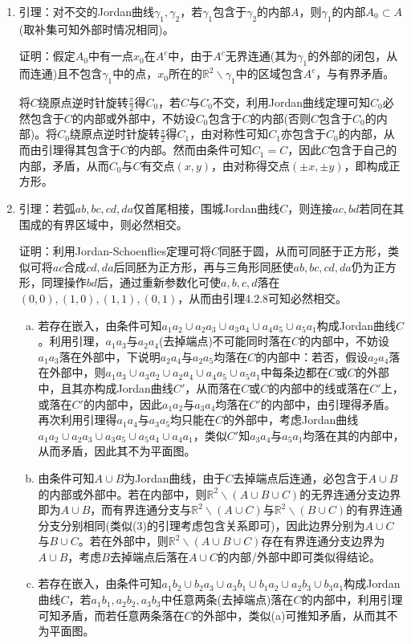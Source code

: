 \documentclass[a4paper,UTF8,fontset=windows]{ctexart}
\begin{document}
\begin{enumerate}[(1)]
    \item
    引理：对不交的Jordan曲线$\gamma_1,\gamma_2$，若$\gamma_1$包含于$\gamma_2$的内部$A$，则$\gamma_1$的内部$A_0\subset A$(取补集可知外部时情况相同)。

    证明：假定$A_0$中有一点$x_0$在$A^c$中，由于$A^c$无界连通(其为$\gamma_1$的外部的闭包，从而连通)且不包含$\gamma_1$中的点，$x_0$所在的$\mathbb{R}^2\backslash\gamma_1$中的区域包含$A^c$，与有界矛盾。

    将$C$绕原点逆时针旋转$\frac{\pi}{2}$得$C_0$，若$C$与$C_0$不交，利用Jordan曲线定理可知$C_0$必然包含于$C$的内部或外部中，不妨设$C_0$包含于$C$的内部(否则$C$包含于$C_0$的内部)。将$C_0$绕原点逆时针旋转$\frac{\pi}{2}$得$C_1$，由对称性可知$C_1$亦包含于$C_0$的内部，从而由引理得其包含于$C$的内部。然而由条件可知$C_1=C$，因此$C$包含于自己的内部，矛盾，从而$C_0$与$C$有交点$(x,y)$，由对称得交点$(\pm x,\pm y)$，即构成正方形。

    \item
    引理：若弧$ab,bc,cd,da$仅首尾相接，围城Jordan曲线$C$，则连接$ac,bd$若同在其围成的有界区域中，则必然相交。

    证明：利用Jordan-Schoenflies定理可将$C$同胚于圆，从而可同胚于正方形，类似可将$ac$合成$cd,da$后同胚为正方形，再与三角形同胚使$ab,bc,cd,da$仍为正方形，同理操作$bd$后，通过重新参数化可使$a,b,c,d$落在$(0,0),(1,0),(1,1),(0,1)$，从而由引理4.2.8可知必然相交。

    \begin{enumerate}[(a)]
    \item
    若存在嵌入，由条件可知$a_1a_2\cup a_2a_3\cup a_3a_4\cup a_4a_5\cup a_5a_1$构成Jordan曲线$C$。利用引理，$a_1a_3$与$a_2a_4$(去掉端点)不可能同时落在$C$的内部中，不妨设$a_1a_3$落在外部中，下说明$a_2a_4$与$a_2a_5$均落在$C$的内部中：若否，假设$a_2a_4$落在外部中，则$a_1a_3\cup a_3a_2\cup a_2a_4\cup a_4a_5\cup a_5a_1$中每条边都在$C$或$C$的外部中，且其亦构成Jordan曲线$C'$，从而落在$C$或$C$的内部中的线或落在$C'$上，或落在$C'$的内部中，因此$a_1a_2$与$a_3a_4$均落在$C'$的内部中，由引理得矛盾。再次利用引理得$a_1a_4$与$a_3a_5$均只能在$C$的外部中，考虑Jordan曲线$a_1a_2\cup a_2a_3\cup a_3a_5\cup a_5a_4\cup a_4a_1$，类似$C'$知$a_3a_4$与$a_5a_1$均落在其的内部中，从而矛盾，因此其不为平面图。

    \item
    由条件可知$A\cup B$为Jordan曲线，由于$C$去掉端点后连通，必包含于$A\cup B$的内部或外部中。若在内部中，则$\mathbb{R}^2\backslash(A\cup B\cup C)$的无界连通分支边界即为$A\cup B$，而有界连通分支与$\mathbb{R}^2\backslash(A\cup C)$与$\mathbb{R}^2\backslash(B\cup C)$的有界连通分支分别相同(类似(3)的引理考虑包含关系即可)，因此边界分别为$A\cup C$与$B\cup C$。若在外部中，则$\mathbb{R}^2\backslash(A\cup B\cup C)$存在有界连通分支边界为$A\cup B$，考虑$B$去掉端点后落在$A\cup C$的内部/外部中即可类似得结论。

    \item
    若存在嵌入，由条件可知$a_1b_2\cup b_2a_3\cup a_3b_1\cup b_1a_2\cup a_2b_3\cup b_3a_1$构成Jordan曲线$C$，若$a_1b_1,a_2b_2,a_3b_3$中任意两条(去掉端点)落在$C$的内部中，利用引理可知矛盾，而若任意两条落在$C$的外部中，类似(a)可推知矛盾，从而其不为平面图。
    \end{enumerate}
\end{enumerate}
\end{document}
